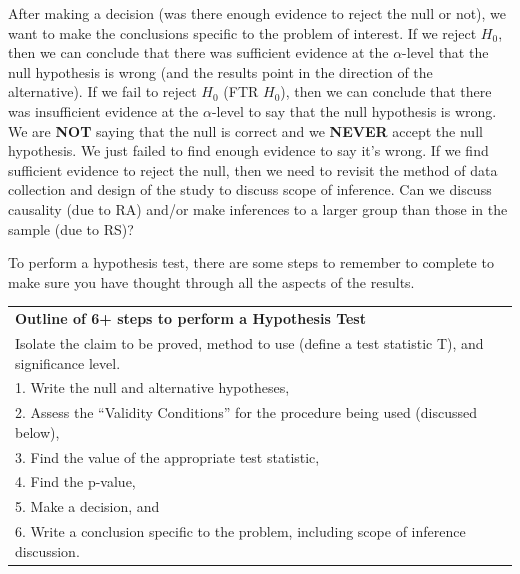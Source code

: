 \documentclass[]{book}
\begin{document}
After making a decision (was there enough evidence to reject the null or
not), we want to make the conclusions specific to the problem of
interest. If we reject \(H_0\), then we can conclude that there was
sufficient evidence at the \(\alpha\)-level that the null hypothesis is
wrong (and the results point in the direction of the alternative). If we
fail to reject \(H_0\) (FTR \(H_0\)), then we can conclude that there
was insufficient evidence at the \(\alpha\)-level to say that the null
hypothesis is wrong. We are \textbf{NOT} saying that the null is correct
and we \textbf{NEVER} accept the null hypothesis. We just failed to find
enough evidence to say it's wrong. If we find sufficient evidence to
reject the null, then we need to revisit the method of data collection
and design of the study to discuss scope of inference. Can we discuss
causality (due to RA) and/or make inferences to a larger group than
those in the sample (due to RS)?

To perform a hypothesis test, there are some steps to remember to
complete to make sure you have thought through all the aspects of the
results.

\begin{longtable}[]{@{}l@{}}
\toprule
\begin{minipage}[t]{0.97\columnwidth}\raggedright\strut
\textbf{Outline of 6+ steps to perform a Hypothesis Test}\strut
\end{minipage}\tabularnewline
\begin{minipage}[t]{0.97\columnwidth}\raggedright\strut
Isolate the claim to be proved, method to use (define a test statistic
T), and significance level.\strut
\end{minipage}\tabularnewline
\begin{minipage}[t]{0.97\columnwidth}\raggedright\strut
1. Write the null and alternative hypotheses,\strut
\end{minipage}\tabularnewline
\begin{minipage}[t]{0.97\columnwidth}\raggedright\strut
2. Assess the ``Validity Conditions'' for the procedure being used
(discussed below),\strut
\end{minipage}\tabularnewline
\begin{minipage}[t]{0.97\columnwidth}\raggedright\strut
3. Find the value of the appropriate test statistic,\strut
\end{minipage}\tabularnewline
\begin{minipage}[t]{0.97\columnwidth}\raggedright\strut
4. Find the p-value,\strut
\end{minipage}\tabularnewline
\begin{minipage}[t]{0.97\columnwidth}\raggedright\strut
5. Make a decision, and\strut
\end{minipage}\tabularnewline
\begin{minipage}[t]{0.97\columnwidth}\raggedright\strut
6. Write a conclusion specific to the problem, including scope of
inference discussion.\strut
\end{minipage}\tabularnewline
\bottomrule
\end{longtable}
\end{document}
